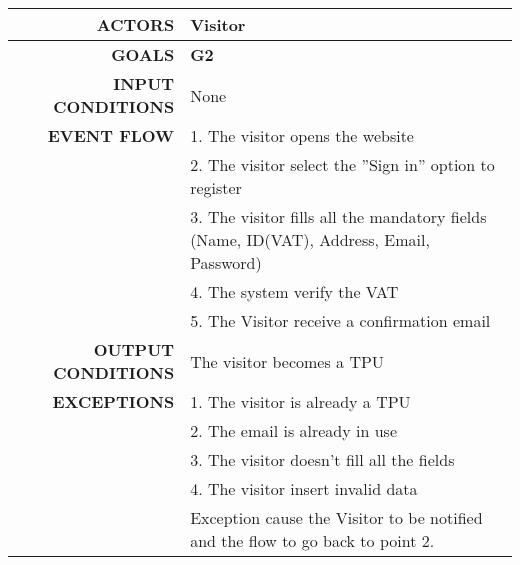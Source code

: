 \begin{table}[h!]
\begin{tabular}{|r|p{3in}|}
\hline
\textbf{ACTORS} & Visitor\\
\hline
\textbf{GOALS} & \textbf{G2} \\
\hline
\textbf{INPUT CONDITIONS} & None \\
\hline
\textbf{EVENT FLOW} 
&1. The visitor opens the website \\
&2. The visitor select the ''Sign in'' option to register \\
&3. The visitor fills all the mandatory fields (Name, ID(VAT), Address, Email, Password) \\
&4. The system verify the VAT\\
&5. The Visitor receive a confirmation email \\
\hline
\textbf{OUTPUT CONDITIONS} & The visitor becomes a TPU \\
\hline
\textbf{EXCEPTIONS} 
&1. The visitor is already a TPU \\
&2. The email is already in use \\
&3. The visitor doesn't fill all the fields\\
&4. The visitor insert invalid data \\
&Exception cause the Visitor to be notified and the flow to go back to point 2.\\
\hline
\end{tabular}
\end{table}